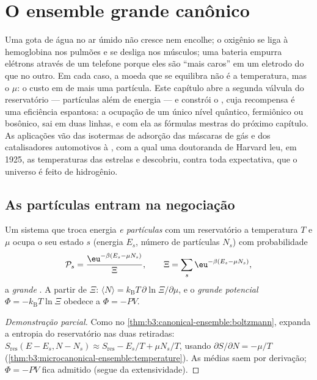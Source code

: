 \chapter{O ensemble grande canônico}\label{ch:b3:grand-canonical}

Uma gota de água no ar úmido não cresce nem encolhe; o oxigênio se
liga à hemoglobina nos pulmões e se desliga nos músculos; uma bateria
empurra elétrons através de um telefone porque eles são ``mais caros''
em um eletrodo do que no outro. Em cada caso, a moeda que se equilibra
não é a temperatura, mas o \emph{} $\mu$: o custo em
 de mais uma partícula. Este capítulo abre a segunda
válvula do reservatório --- partículas além de energia --- e constrói o
, cuja recompensa é uma eficiência espantosa: a
ocupação de um único nível quântico, fermiônico ou bosônico, sai em
duas linhas, e com ela as fórmulas mestras do próximo capítulo. As
aplicações vão das isotermas de adsorção das máscaras de gás e dos
catalisadores automotivos à , com a qual uma doutoranda
de Harvard leu, em 1925, as temperaturas das estrelas e descobriu,
contra toda expectativa, que o universo é feito de hidrogênio.

\section{As partículas entram na negociação}

\begin{theorem}\label{thm:b3:grand-canonical:distribution}
Um sistema que troca energia \emph{e partículas} com um reservatório a
temperatura $T$ e  $\mu$ ocupa o seu estado $s$
(energia $E_s$, número de partículas $N_s$) com probabilidade
\[
\mathcal P_s = \frac{\eu^{-\beta(E_s - \mu N_s)}}{\Xi} , \qquad
\Xi = \sum_s\eu^{-\beta(E_s - \mu N_s)} ,
\]
a \emph{grande }. A partir de $\Xi$: $\langle N\rangle
= k_{\text{B}}T\,\partial\ln\Xi/\partial\mu$, e o \emph{grande
potencial} $\Phi = -k_{\text{B}}T\ln\Xi$ obedece a $\Phi = -PV$.
\end{theorem}

\begin{proof}[Demonstração parcial]
Como no \cref{thm:b3:canonical-ensemble:boltzmann}, expanda a entropia
do reservatório nas duas retiradas:
$S_{\text{res}}(E - E_s, N - N_s) \approx S_{\text{res}} - E_s/T +
\mu N_s/T$, usando $\partial S/\partial N = -\mu/T$
(\cref{thm:b3:microcanonical-ensemble:temperature}). As médias saem por
derivação; $\Phi = -PV$ fica admitido (segue da extensividade).
\end{proof}

